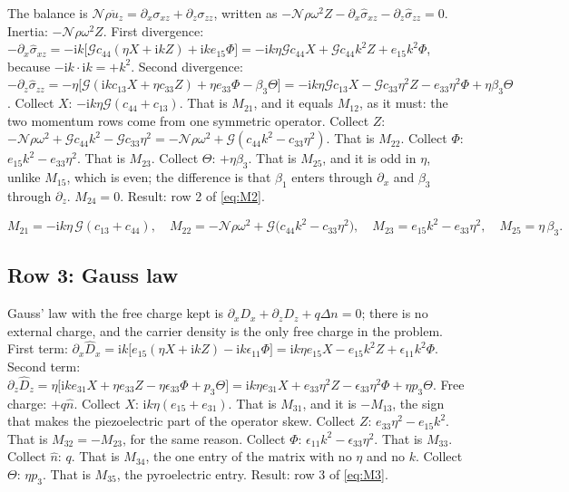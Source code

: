\documentclass[11pt]{article}
\makeatletter
\newif\ifshowworked
\newenvironment{worked}{%
  \ifshowworked\par\smallskip\noindent\textit{Working.}\par\smallskip\else
  \setbox\z@\vbox\bgroup\fi}{\ifshowworked\par\smallskip\else\egroup\fi}
\newcommand{\ii}{\mathrm{i}}
\newcommand{\Ncal}{\mathcal{N}}
\newcommand{\Gcal}{\mathcal{G}}
\makeatother
\begin{document}
\begin{worked}
The balance is $\Ncal\rho\ddot u_z=\partial_x\sigma_{xz}+\partial_z\sigma_{zz}$, written as
$-\Ncal\rho\omega^2Z-\partial_x\hat\sigma_{xz}-\partial_z\hat\sigma_{zz}=0$.
Inertia: $-\Ncal\rho\omega^2Z$.
First divergence: $-\partial_x\hat\sigma_{xz}=-\ii k\bigl[\Gcal c_{44}(\eta X+\ii kZ)
+\ii k e_{15}\Phi\bigr]=-\ii k\eta\Gcal c_{44}X+\Gcal c_{44}k^2Z+e_{15}k^2\Phi$, because
$-\ii k\cdot\ii k=+k^2$.
Second divergence: $-\partial_z\hat\sigma_{zz}=-\eta\bigl[\Gcal(\ii kc_{13}X+\eta c_{33}Z)
+\eta e_{33}\Phi-\beta_3\Theta\bigr]
=-\ii k\eta\Gcal c_{13}X-\Gcal c_{33}\eta^2Z-e_{33}\eta^2\Phi+\eta\beta_3\Theta$.
Collect $X$: $-\ii k\eta\Gcal(c_{44}+c_{13})$. That is $M_{21}$, and it equals $M_{12}$, as it must:
the two momentum rows come from one symmetric operator.
Collect $Z$: $-\Ncal\rho\omega^2+\Gcal c_{44}k^2-\Gcal c_{33}\eta^2
=-\Ncal\rho\omega^2+\Gcal(c_{44}k^2-c_{33}\eta^2)$. That is $M_{22}$.
Collect $\Phi$: $e_{15}k^2-e_{33}\eta^2$. That is $M_{23}$.
Collect $\Theta$: $+\eta\beta_3$. That is $M_{25}$, and it is odd in $\eta$, unlike $M_{15}$, which is
even; the difference is that $\beta_1$ enters through $\partial_x$ and $\beta_3$ through $\partial_z$.
$M_{24}=0$. Result: row 2 of \eqref{eq:M2}.
\end{worked}

\begin{equation}\label{eq:M2}
M_{21}=-\ii k\eta\,\Gcal(c_{13}+c_{44}),\quad
M_{22}=-\Ncal\rho\omega^2+\Gcal\bigl(c_{44}k^2-c_{33}\eta^2\bigr),\quad
M_{23}=e_{15}k^2-e_{33}\eta^2,\quad
M_{25}=\eta\,\beta_3 .
\label{eq:M2}
\end{equation}

\subsection*{Row 3: Gauss law}

\begin{worked}
Gauss' law with the free charge kept is $\partial_xD_x+\partial_zD_z+q\Delta n=0$; there is
no external charge, and the carrier density is the only free charge in the problem.
First term: $\partial_x\hat D_x=\ii k\bigl[e_{15}(\eta X+\ii kZ)-\ii k\epsilon_{11}\Phi\bigr]
=\ii k\eta e_{15}X-e_{15}k^2Z+\epsilon_{11}k^2\Phi$.
Second term: $\partial_z\hat D_z=\eta\bigl[\ii ke_{31}X+\eta e_{33}Z-\eta\epsilon_{33}\Phi
+p_3\Theta\bigr]=\ii k\eta e_{31}X+e_{33}\eta^2Z-\epsilon_{33}\eta^2\Phi+\eta p_3\Theta$.
Free charge: $+q\hat n$.
Collect $X$: $\ii k\eta(e_{15}+e_{31})$. That is $M_{31}$, and it is $-M_{13}$, the sign that makes the
piezoelectric part of the operator skew.
Collect $Z$: $e_{33}\eta^2-e_{15}k^2$. That is $M_{32}=-M_{23}$, for the same reason.
Collect $\Phi$: $\epsilon_{11}k^2-\epsilon_{33}\eta^2$. That is $M_{33}$.
Collect $\hat n$: $q$. That is $M_{34}$, the one entry of the matrix with no $\eta$ and no $k$.
Collect $\Theta$: $\eta p_3$. That is $M_{35}$, the pyroelectric entry.
Result: row 3 of \eqref{eq:M3}.
\end{worked}
\end{document}
